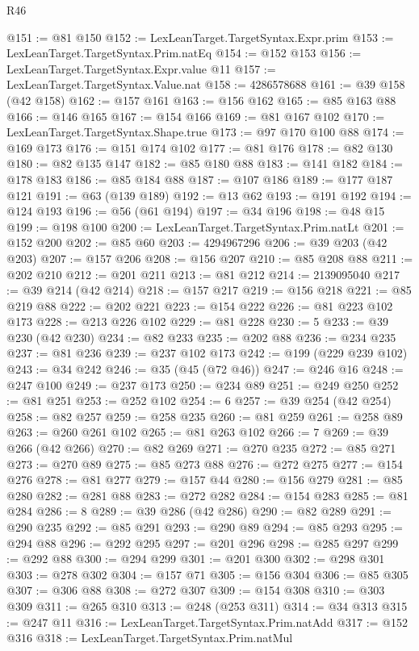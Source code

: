 \begin{lexlean}{R46}
\begin{coremodule}
@151 := @81 @150
@152 := LexLeanTarget.TargetSyntax.Expr.prim
@153 := LexLeanTarget.TargetSyntax.Prim.natEq
@154 := @152 @153
@156 := LexLeanTarget.TargetSyntax.Expr.value @11
@157 := LexLeanTarget.TargetSyntax.Value.nat
@158 := 4286578688
@161 := @39 @158 (@42 @158)
@162 := @157 @161
@163 := @156 @162
@165 := @85 @163 @88
@166 := @146 @165
@167 := @154 @166
@169 := @81 @167 @102
@170 := LexLeanTarget.TargetSyntax.Shape.true
@173 := @97 @170 @100 @88
@174 := @169 @173
@176 := @151 @174 @102
@177 := @81 @176
@178 := @82 @130
@180 := @82 @135 @147
@182 := @85 @180 @88
@183 := @141 @182
@184 := @178 @183
@186 := @85 @184 @88
@187 := @107 @186
@189 := @177 @187 @121
@191 := @63 (@139 @189)
@192 := @13 @62
@193 := @191 @192
@194 := @124 @193
@196 := @56 (@61 @194)
@197 := @34 @196
@198 := @48 @15
@199 := @198 @100
@200 := LexLeanTarget.TargetSyntax.Prim.natLt
@201 := @152 @200
@202 := @85 @60
@203 := 4294967296
@206 := @39 @203 (@42 @203)
@207 := @157 @206
@208 := @156 @207
@210 := @85 @208 @88
@211 := @202 @210
@212 := @201 @211
@213 := @81 @212
@214 := 2139095040
@217 := @39 @214 (@42 @214)
@218 := @157 @217
@219 := @156 @218
@221 := @85 @219 @88
@222 := @202 @221
@223 := @154 @222
@226 := @81 @223 @102 @173
@228 := @213 @226 @102
@229 := @81 @228
@230 := 5
@233 := @39 @230 (@42 @230)
@234 := @82 @233
@235 := @202 @88
@236 := @234 @235
@237 := @81 @236
@239 := @237 @102 @173
@242 := @199 (@229 @239 @102)
@243 := @34 @242
@246 := @35 (@45 (@72 @46))
@247 := @246 @16
@248 := @247 @100
@249 := @237 @173
@250 := @234 @89
@251 := @249 @250
@252 := @81 @251
@253 := @252 @102
@254 := 6
@257 := @39 @254 (@42 @254)
@258 := @82 @257
@259 := @258 @235
@260 := @81 @259
@261 := @258 @89
@263 := @260 @261 @102
@265 := @81 @263 @102
@266 := 7
@269 := @39 @266 (@42 @266)
@270 := @82 @269
@271 := @270 @235
@272 := @85 @271
@273 := @270 @89
@275 := @85 @273 @88
@276 := @272 @275
@277 := @154 @276
@278 := @81 @277
@279 := @157 @44
@280 := @156 @279
@281 := @85 @280
@282 := @281 @88
@283 := @272 @282
@284 := @154 @283
@285 := @81 @284
@286 := 8
@289 := @39 @286 (@42 @286)
@290 := @82 @289
@291 := @290 @235
@292 := @85 @291
@293 := @290 @89
@294 := @85 @293
@295 := @294 @88
@296 := @292 @295
@297 := @201 @296
@298 := @285 @297
@299 := @292 @88
@300 := @294 @299
@301 := @201 @300
@302 := @298 @301
@303 := @278 @302
@304 := @157 @71
@305 := @156 @304
@306 := @85 @305
@307 := @306 @88
@308 := @272 @307
@309 := @154 @308
@310 := @303 @309
@311 := @265 @310
@313 := @248 (@253 @311)
@314 := @34 @313
@315 := @247 @11
@316 := LexLeanTarget.TargetSyntax.Prim.natAdd
@317 := @152 @316
@318 := LexLeanTarget.TargetSyntax.Prim.natMul

\end{coremodule}
\end{lexlean}
